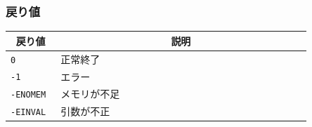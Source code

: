 \documentclass[twoside,11pt,fleqn]{book}
\begin{document}
\subsubsection*{戻り値}{\quad}
\begin{table}[!h]
\footnotesize
\begin{tabular}{|p{0.15\linewidth}|p{0.75\linewidth}|} \hline
\multicolumn{1}{|c}{\textbf{戻り値}}&\multicolumn{1}{|c|}{\textbf{説明}}\\ \hline \hline
\texttt{0}&正常終了\\ \hline
\texttt{-1}&エラー\\ \hline
\texttt{-ENOMEM}&メモリが不足\\ \hline
\texttt{-EINVAL}&引数が不正\\ \hline
\end{tabular}
\vspace{-0em}
\end{table}
\end{document}

